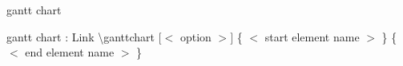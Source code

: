 \documentclass[ aspectratio=169,  12pt,blue,xcolor=pdftex,dvipsnames,table,handout,notes]{beamer}
\begin{document}

		\begin{frame}[plain]

			\centering
			\scalebox{4}{Gantt chart}
	
		\end{frame}









		\begin{frame}[t]{gantt chart}

			\begin{block}{ gantt chart : Link}
			\textbackslash 	ganttchart \([ <\) option \(> ] \)
							\{ \(<\) start element name \(>\) \} 
							\{ \(<\) end element name \(>\) \} 
			\end{block}
 
		\end{frame}
\end{document}
